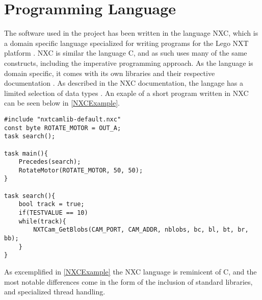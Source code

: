 \section{Programming Language}
The software used in the \name project has been written in the language NXC,
which is a domain specific language specialized for writing programs for the
Lego NXT platform \cite{NXCIntro}. NXC is similar the language C, and as such
uses many of the same constructs, including the imperative programming approach. As the
language is domain specific, it comes with its own libraries and their
respective documentation \cite{NXCIntro}. As described in the NXC documentation,
the langage has a limited selection of data types \cite{NXCVariables}. An exaple
of a short program written in NXC can be seen below in \autoref{NXCExample}.\nl

\begin{minipage}[H]{\linewidth}
\begin{lstlisting}[caption = Exaple of a program written in the NXC language, label = NXCExample] 
#include "nxtcamlib-default.nxc"
const byte ROTATE_MOTOR = OUT_A;
task search();

task main(){
    Precedes(search);
    RotateMotor(ROTATE_MOTOR, 50, 50);
}

task search(){
	bool track = true;
	if(TESTVALUE == 10)
	while(track){
        NXTCam_GetBlobs(CAM_PORT, CAM_ADDR, nblobs, bc, bl, bt, br, bb);
	}
}
\end{lstlisting}
\end{minipage}

As excemplified in \autoref{NXCExample} the NXC language is reminicent of C, and
the most notable differences come in the form of the inclusion of standard
libraries, and specialized thread handling.
